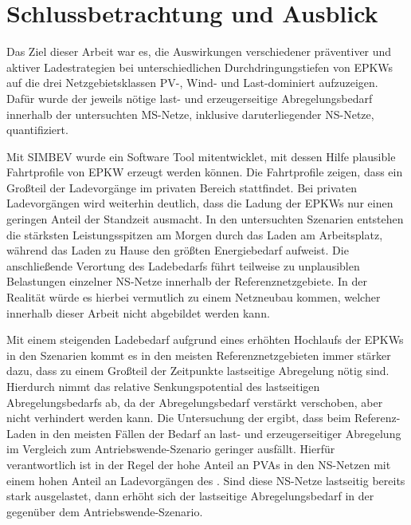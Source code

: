 \section{Schlussbetrachtung und Ausblick}\label{chap:schlussbetrachtung}

Das Ziel dieser Arbeit war es, die Auswirkungen verschiedener präventiver und aktiver Ladestrategien bei unterschiedlichen Durchdringungstiefen von \glspl{EPKW} auf die drei Netzgebietsklassen \gls{PV}-, Wind- und Last-dominiert aufzuzeigen.
Dafür wurde der jeweils nötige last- und erzeugerseitige Abregelungsbedarf innerhalb der untersuchten \gls{MS}-Netze, inklusive daruterliegender \gls{NS}-Netze, quantifiziert.\medskip

Mit \gls{SIMBEV} wurde ein Software Tool mitentwicklet, mit dessen Hilfe plausible Fahrtprofile von \gls{EPKW} erzeugt werden können.
Die Fahrtprofile zeigen, dass ein Großteil der Ladevorgänge im privaten Bereich stattfindet.
Bei privaten Ladevorgängen wird weiterhin deutlich, dass die Ladung der \glspl{EPKW} nur einen geringen Anteil der Standzeit ausmacht.
In den untersuchten Szenarien entstehen die stärksten Leistungsspitzen am Morgen durch das Laden am Arbeitsplatz, während das Laden zu Hause den größten Energiebedarf aufweist.
Die anschließende Verortung des Ladebedarfs führt teilweise zu unplausiblen Belastungen einzelner \gls{NS}-Netze innerhalb der Referenznetzgebiete.
In der Realität würde es hierbei vermutlich zu einem Netzneubau kommen, welcher innerhalb dieser Arbeit nicht abgebildet werden kann.\medskip

Mit einem steigenden Ladebedarf aufgrund eines erhöhten Hochlaufs der \glspl{EPKW} in den Szenarien kommt es in den meisten Referenznetzgebieten immer stärker dazu, dass zu einem Großteil der Zeitpunkte lastseitige Abregelung nötig sind.
Hierdurch nimmt das relative Senkungspotential des lastseitigen Abregelungsbedarfs ab, da der Abregelungsbedarf verstärkt verschoben, aber nicht verhindert werden kann.
Die Untersuchung der \SzeFirmenparkplatz ergibt, dass beim Referenz-Laden in den meisten Fällen der Bedarf an last- und erzeugerseitiger Abregelung im Vergleich zum Antriebswende-Szenario geringer ausfällt.
Hierfür verantwortlich ist in der Regel der hohe Anteil an \glspl{PVA} in den \gls{NS}-Netzen mit einem hohen Anteil an Ladevorgängen des \UC \zHdot.
Sind diese \gls{NS}-Netze lastseitig bereits stark ausgelastet, dann erhöht sich der lastseitige Abregelungsbedarf in der \SzeFirmenparkplatz gegenüber dem Antriebswende-Szenario.\medskip

